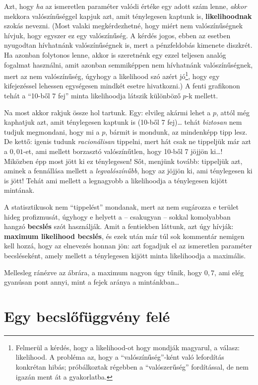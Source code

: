 \documentclass[magyar,]{book}
\let\rmarkdownfootnote\footnote%
\def\footnote{\protect\rmarkdownfootnote}
\begin{document}
Azt, hogy \emph{ha} az ismeretlen paraméter valódi értéke egy adott szám lenne, \emph{akkor} mekkora valószínűséggel kapjuk azt, amit ténylegesen kaptunk is, \textbf{likelihoodnak} szokás nevezni. (Most valaki megkérdezhetné, hogy miért nem valószínűségnek hívjuk, hogy egyszer ez egy valószínűség. A kérdés jogos, ebben az esetben nyugodtan hívhatnánk valószínűségnek is, mert a pénzfeldobás kimenete diszkrét. Ha azonban folytonos lenne, akkor is szeretnénk egy ezzel teljesen analóg fogalmat használni, amit azonban semmiképpen nem hívhatnánk valószínűségnek, mert az nem valószínűség, úgyhogy a likelihood szó azért jó\footnote{Felmerül a kérdés, hogy a likelihood-ot hogy mondják magyarul, a válasz: likelihood. A probléma az, hogy a \enquote{valószínűség}-ként való lefordítás konkrétan hibás; próbálkoztak régebben a \enquote{valószerűség} fordítással, de nem igazán ment át a gyakorlatba.}, hogy egy kifejezéssel lehessen egységesen mindkét esetre hivatkozni.) A fenti grafikonon tehát a \enquote{10-ből 7 fej} minta likelihoodja látszik különböző \(p\)-k mellett.

Na most akkor rakjuk össze hol tartunk. Egy: elvileg akármi lehet a \(p\), attól még kaphatjuk azt, amit ténylegesen kaptunk is (10-ből 7 fej)\ldots{} tehát \emph{biztosan} nem tudjuk megmondani, hogy mi a \(p\), bármit is mondunk, az mindenképp tipp lesz. De kettő: igenis tudunk \emph{racionálisan} tippelni, mert hát csak ne tippeljük már azt a \(0,\!01\)-et, ami mellett borzasztó valószínűtlen, hogy 10-ből 7 jöjjön ki\ldots! Miközben épp most jött ki ez ténylegesen! Sőt, menjünk tovább: tippeljük azt, aminek a fennállása mellett a \emph{legvalószínűbb}, hogy az jöjjön ki, ami ténylegesen ki is jött! Tehát ami mellett a legnagyobb a likelihoodja a ténylegesen kijött mintának.

A statisztikusok nem \enquote{tippelést} mondanak, mert az nem sugározza e terület hideg profizmusát, úgyhogy e helyett a -- csakugyan -- sokkal komolyabban hangzó \textbf{becslés} szót használják. Amit a fentiekben láttunk, azt úgy hívják: \textbf{maximum likelihood becslés}, és ezek után már túl sok kommentár nemigen kell hozzá, hogy az elnevezés honnan jön: azt fogadjuk el az ismeretlen paraméter becsléseként, amely mellett a ténylegesen kijött minta likelihoodja a maximális.

Mellesleg ránézve az ábrára, a maximum nagyon úgy tűnik, hogy \(0,\!7\), ami elég gyanúsan pont annyi, mint a fejek aránya a mintánkban\ldots{}

\hypertarget{egy-becslux151fuxfcggvuxe9ny-feluxe9}{%
\section{Egy becslőfüggvény felé}\label{egy-becslux151fuxfcggvuxe9ny-feluxe9}}
\end{document}
